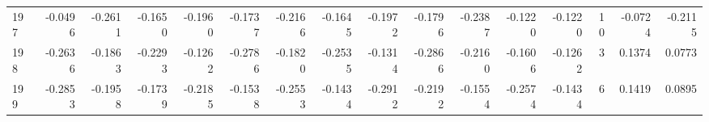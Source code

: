 \begin{tabular}{lrrrrrrrrrrrrrrr}
197 &     -0.0496 & -0.2611 & -0.1650 & -0.1960 & -0.1737 & -0.2166 & -0.1645 & -0.1972 & -0.1796 & -0.2387 &  -0.1220 &    -0.1220 &     10 &                   -0.0724 &                    -0.2115 \\
198 &     -0.2636 & -0.1863 & -0.2293 & -0.1262 & -0.2786 & -0.1820 & -0.2535 & -0.1314 & -0.2866 & -0.2160 &  -0.1606 &    -0.1262 &      3 &                    0.1374 &                     0.0773 \\
199 &     -0.2853 & -0.1958 & -0.1739 & -0.2185 & -0.1538 & -0.2553 & -0.1434 & -0.2912 & -0.2192 & -0.1554 &  -0.2574 &    -0.1434 &      6 &                    0.1419 &                     0.0895 \\
\bottomrule
\end{tabular}
